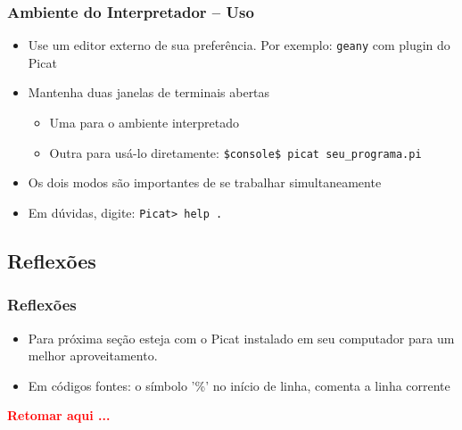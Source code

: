 \begin{frame}[fragile]
\frametitle{Ambiente do Interpretador -- Uso}

\begin{itemize}
  \item Use um editor externo de sua preferência. Por exemplo:
   \texttt{geany} com plugin do Picat

    \pause
  \item Mantenha duas janelas de terminais abertas
    \begin{itemize}
    \item Uma para o ambiente interpretado
    \item Outra para usá-lo diretamente: \texttt{\$console\$ picat seu\_programa.pi}
  \end{itemize}
  
    \pause
  \item Os dois modos são importantes de se trabalhar simultaneamente
  
  \pause
  \item Em dúvidas, digite: \texttt{Picat> help .}
    
\end{itemize}

\end{frame}


\subsection{Reflexões}
\begin{frame}[fragile]
\frametitle{Reflexões}

\begin{itemize}

      \pause
      \item Para próxima seção esteja com o Picat instalado em seu 
      computador para um melhor aproveitamento.
    \pause

  \item Em códigos fontes: o símbolo '\%' no início de linha, comenta a linha  corrente

\end{itemize}

\textbf{\textcolor{red}{Retomar aqui ...}}  
\end{frame}

